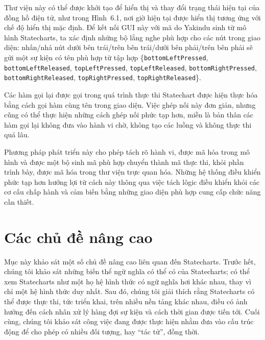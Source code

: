 Thư viện này có thể được khởi tạo để hiển thị và thay đổi trạng thái hiện tại của đồng hồ điện tử, như trong Hình~6.1, nơi giờ hiện tại được hiển thị tương ứng với chế độ hiển thị mặc định. Để kết nối GUI này với mã do Yakindu sinh từ mô hình Statecharts, ta xác định những bộ lắng nghe phù hợp cho các nút trong giao diện: nhấn/nhả nút dưới bên trái/trên bên trái/dưới bên phải/trên bên phải sẽ gửi một sự kiện có tên phù hợp từ tập hợp \{\texttt{bottomLeftPressed}, \texttt{bottomLeftReleased}, \texttt{topLeftPressed}, \texttt{topLeftReleased}, \texttt{bottomRightPressed}, \texttt{bottomRightReleased}, \texttt{topRightPressed}, \texttt{topRightReleased}\}.

Các hàm gọi lại được gọi trong quá trình thực thi Statechart được hiện thực hóa bằng cách gọi hàm cùng tên trong giao diện. Việc ghép nối này đơn giản, nhưng cũng có thể thực hiện những cách ghép nối phức tạp hơn, miễn là bản thân các hàm gọi lại không đưa vào hành vi chờ, không tạo các luồng và không thực thi quá lâu.

Phương pháp phát triển này cho phép tách rõ hành vi, được mã hóa trong mô hình và được một bộ sinh mã phù hợp chuyển thành mã thực thi, khỏi phần trình bày, được mã hóa trong thư viện trực quan hóa. Những hệ thống điều khiển phức tạp hơn hưởng lợi từ cách này thông qua việc tách lôgic điều khiển khỏi các cơ cấu chấp hành và cảm biến bằng những giao diện phù hợp cung cấp chức năng cần thiết.

\section{Các chủ đề nâng cao}
Mục này khảo sát một số chủ đề nâng cao liên quan đến Statecharts. Trước hết, chúng tôi khảo sát những biến thể ngữ nghĩa có thể có của Statecharts; có thể xem Statecharts như một họ hệ hình thức có ngữ nghĩa hơi khác nhau, thay vì chỉ một hệ hình thức duy nhất. Sau đó, chúng tôi giải thích rằng Statecharts có thể được thực thi, tức triển khai, trên nhiều nền tảng khác nhau, điều có ảnh hưởng đến cách nhân xử lý hàng đợi sự kiện và cách thời gian được tiến tới. Cuối cùng, chúng tôi khảo sát công việc đang được thực hiện nhằm đưa vào cấu trúc động để cho phép có nhiều đối tượng, hay ``tác tử'', đồng thời.

